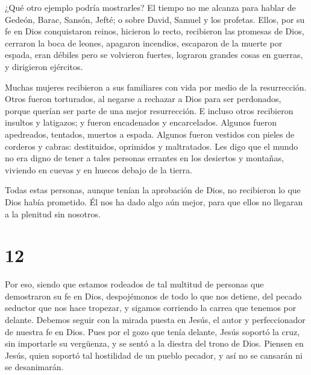  ¿Qué otro ejemplo podría mostrarles? El tiempo no me
alcanza para hablar de Gedeón, Barac, Sansón, Jefté; o sobre David,
Samuel y los profetas.  Ellos, por su fe en Dios
conquistaron reinos, hicieron lo recto, recibieron las promesas de Dios,
cerraron la boca de leones,  apagaron incendios, escaparon
de la muerte por espada, eran débiles pero se volvieron fuertes,
lograron grandes cosas en guerras, y dirigieron ejércitos.

 Muchas mujeres recibieron a sus familiares con vida por
medio de la resurrección. Otros fueron torturados, al negarse a rechazar
a Dios para ser perdonados, porque querían ser parte de una mejor
resurrección.  E incluso otros recibieron insultos y
latigazos; y fueron encadenados y encarcelados.  Algunos
fueron apedreados, tentados, muertos a espada. Algunos fueron vestidos
con pieles de corderos y cabras: destituidos, oprimidos y maltratados.
 Les digo que el mundo no era digno de tener a tales
personas errantes en los desiertos y montañas, viviendo en cuevas y en
huecos debajo de la tierra.

 Todas estas personas, aunque tenían la aprobación de Dios,
no recibieron lo que Dios había prometido.  Él nos ha dado
algo aún mejor, para que ellos no llegaran a la plenitud sin nosotros.

\hypertarget{section-11}{%
\section{12}\label{section-11}}

 Por eso, siendo que estamos rodeados de tal multitud de
personas que demostraron su fe en Dios, despojémonos de todo lo que nos
detiene, del pecado seductor que nos hace tropezar, y sigamos corriendo
la carrea que tenemos por delante.  Debemos seguir con la
mirada puesta en Jesús, el autor y perfeccionador de nuestra fe en Dios.
Pues por el gozo que tenía delante, Jesús soportó la cruz, sin
importarle su vergüenza, y se sentó a la diestra del trono de Dios.
 Piensen en Jesús, quien soportó tal hostilidad de un pueblo
pecador, y así no se cansarán ni se desanimarán.

